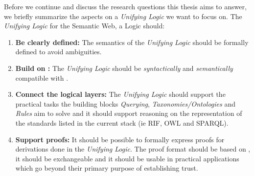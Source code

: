 % 
% 

Before we continue and discuss the research questions this thesis aims to answer, 
we briefly summarize the aspects on a \emph{Unifying Logic} we want to focus on. The \emph{Unifying Logic} for the Semantic Web, a Logic should:
\begin{enumerate}
\item \textbf{Be clearly defined:} The semantics of the \emph{Unifying Logic} should be formally defined to avoid ambiguities.
\item \textbf{Build on \rdf:} The \emph{Unifying Logic} should be \emph{syntactically} and \emph{semantically} compatible with \rdf.
\item \textbf{Connect the logical layers:} The \emph{Unifying Logic}  should support the practical tasks the 
 building blocks \emph{Querying}, \emph{Taxonomies/Ontologies}
and \emph{Rules} aim to solve and it should support reasoning on the \rdf representation of the standards listed in the current stack (ie RIF, OWL and SPARQL).
\item \textbf{Support proofs:} It should be possible to formally express proofs for derivations done in the \emph{Unifying Logic}. The proof format should be based on \rdf, it should be 
exchangeable and it should be usable in practical applications which go  beyond their primary purpose of establishing trust.
\end{enumerate}


